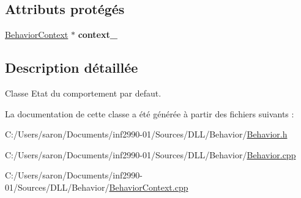 \subsection*{Attributs protégés}
\begin{DoxyCompactItemize}
\item 
\hypertarget{class_behavior_ae794fb00dfe48b0eda2c564a9db92859}{\hyperlink{class_behavior_context}{Behavior\-Context} $\ast$ {\bfseries context\-\_\-}}\label{class_behavior_ae794fb00dfe48b0eda2c564a9db92859}

\end{DoxyCompactItemize}


\subsection{Description détaillée}
Classe Etat du comportement par defaut. 

La documentation de cette classe a été générée à partir des fichiers suivants \-:\begin{DoxyCompactItemize}
\item 
C\-:/\-Users/saron/\-Documents/inf2990-\/01/\-Sources/\-D\-L\-L/\-Behavior/\hyperlink{_behavior_8h}{Behavior.\-h}\item 
C\-:/\-Users/saron/\-Documents/inf2990-\/01/\-Sources/\-D\-L\-L/\-Behavior/\hyperlink{_behavior_8cpp}{Behavior.\-cpp}\item 
C\-:/\-Users/saron/\-Documents/inf2990-\/01/\-Sources/\-D\-L\-L/\-Behavior/\hyperlink{_behavior_context_8cpp}{Behavior\-Context.\-cpp}\end{DoxyCompactItemize}
